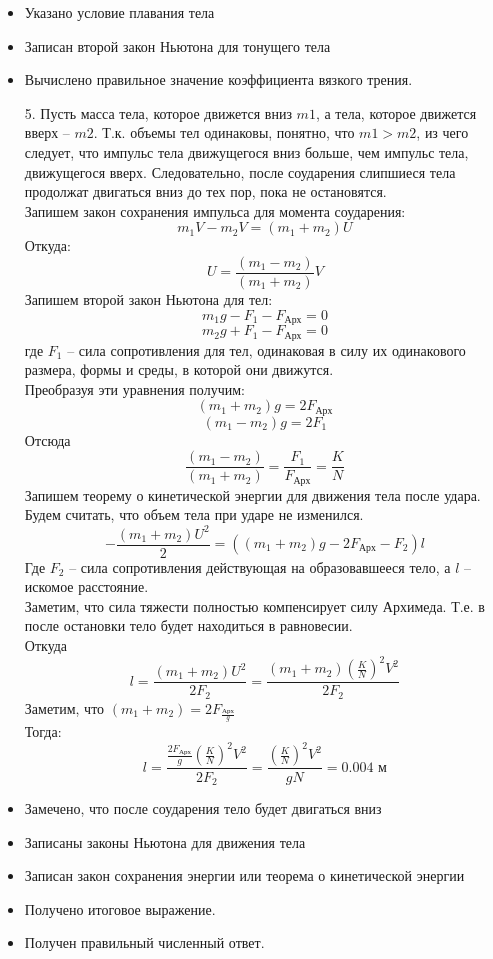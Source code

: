 \begin{itemize}
\item Указано условие плавания тела
\item Записан второй закон Ньютона для тонущего тела
\item Вычислено правильное значение коэффициента вязкого трения.
\end{itemize}
\begin{enumerate}
\item [5.] Пусть масса тела, которое движется вниз $m1$, а тела, которое движется вверх – $m2$. Т.к. объемы тел одинаковы, понятно, что $m1 > m2$, из чего следует, что импульс тела движущегося вниз больше, чем импульс тела, движущегося вверх. Следовательно, после соударения слипшиеся тела продолжат двигаться вниз до тех пор, пока не остановятся.\\
Запишем закон сохранения импульса для момента соударения:
$$m_1V-m_2V=(m_1+m_2)U$$
Откуда: 
$$U=\frac{(m_1-m_2)}{(m_1+m_2 )}V$$
Запишем второй закон Ньютона для тел:
$$m_1 g-F_1-F_\text{Арх}=0$$
$$m_2 g+F_1-F_\text{Арх}=0$$
где $F_1$ – сила сопротивления для тел, одинаковая в силу их одинакового размера, формы и среды, в которой они движутся.\\
Преобразуя эти уравнения получим:
$$(m_1+m_2)g=2F_\text{Арх}$$
$$(m_1-m_2)g=2F_1$$
Отсюда
$$\frac{(m_1-m_2)}{(m_1+m_2)}=\frac{F_1}{F_\text{Арх}}=\frac{K}{N}$$
Запишем теорему о кинетической энергии для движения тела после удара. Будем считать, что объем тела при ударе не изменился.
$$-\frac{(m_1+m_2)U^2}{2}=\left((m_1+m_2)g-2F_\text{Арх}-F_2\right)l$$
Где $F_2$ – сила сопротивления действующая на образовавшееся тело, а $l$ – искомое расстояние.\\
Заметим, что сила тяжести полностью компенсирует силу Архимеда. Т.е. в после остановки тело будет находиться в равновесии.\\
Откуда 
$$l=\frac{(m_1+m_2)U^2}{2F_2}=\frac{(m_1+m_2)\left(\frac{K}{N}\right)^2V^2}{2F_2}$$
Заметим, что $(m_1+m_2)=2F_\frac{\text{Арх}}{g}$\\
Тогда:
$$l=\frac{\frac{2F_\text{Арх}}{g}\left(\frac{K}{N}\right)^2V^2}{2F_2}=\frac{\left(\frac{K}{N}\right)^2V^2}{gN}=0.004\text{ м}$$
\end{enumerate}

\markSection

\begin{itemize}
\item Замечено, что после соударения тело будет двигаться вниз
\item Записаны законы Ньютона для движения тела
\item Записан закон сохранения энергии или теорема о кинетической энергии
\item Получено итоговое выражение.
\item Получен правильный численный ответ.
\end{itemize}